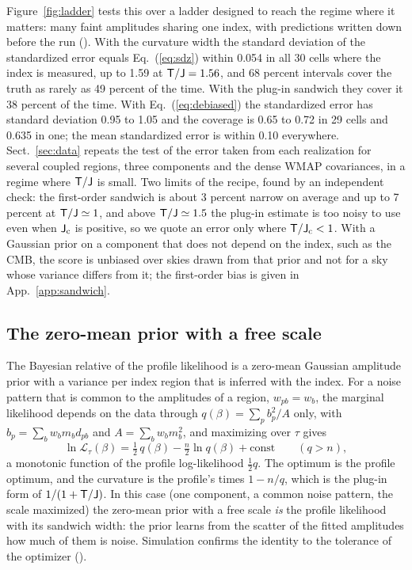 Figure~\ref{fig:ladder} tests this over a ladder designed to reach the regime where it matters:
many faint amplitudes sharing one index, with predictions written down before the run
(). With the curvature width the standard deviation of the standardized error equals
Eq.~(\ref{eq:sdz}) within 0.054 in all 30 cells where the index is measured, up to 1.59 at
$\mathsf{T}/\mathsf{J} = 1.56$, and 68 percent intervals cover the truth as rarely as 49 percent of the time. With
the plug-in sandwich they cover it 38 percent of the time. With Eq.~(\ref{eq:debiased}) the
standardized error has standard deviation 0.95 to 1.05 and the coverage is 0.65 to 0.72 in 29 cells
and 0.635 in one; the mean standardized error is within 0.10 everywhere. Sect.~\ref{sec:data} repeats
the test of the error taken from each realization for several coupled regions, three components and
the dense WMAP covariances, in a regime where $\mathsf{T}/\mathsf{J}$ is small. Two limits of the recipe, found by an independent check: the first-order
sandwich is about 3 percent narrow on average and up to 7 percent at $\mathsf{T}/\mathsf{J} \simeq 1$, and above
$\mathsf{T}/\mathsf{J} \simeq 1.5$ the plug-in estimate is too noisy to use even when $\mathsf{J}_{\rm c}$ is positive, so
we quote an error only where $\mathsf{T}/\mathsf{J}_{\rm c} < 1$. With a Gaussian prior on a component that does
not depend on the index, such as the CMB, the score is unbiased over skies drawn from that prior and
not for a sky whose variance differs from it; the first-order bias is given in
App.~\ref{app:sandwich}.

\subsection{The zero-mean prior with a free scale}

The Bayesian relative of the profile likelihood is a zero-mean Gaussian amplitude prior with a
variance per index region that is inferred with the index. For a noise pattern that is common to the
amplitudes of a region, $w_{pb} = w_b$, the marginal likelihood depends on the data through
$q(\beta) = \sum_p b_p^2/A$ only, with $b_p = \sum_b w_b m_b d_{pb}$ and $A = \sum_b w_b m_b^2$, and
maximizing over $\tau$ gives
\begin{equation}
  \ln\mathcal{L}_{\tau}(\beta) = \tfrac12\, q(\beta) - \tfrac{n}{2}\ln q(\beta) + \mathrm{const}
  \qquad (q > n) ,
\end{equation}
a monotonic function of the profile log-likelihood $\tfrac12 q$. The optimum is the profile optimum,
and the curvature is the profile's times $1 - n/q$, which is the plug-in form of $1/(1+\mathsf{T}/\mathsf{J})$. In
this case (one component, a common noise pattern, the scale maximized) the zero-mean prior with a
free scale \emph{is} the profile likelihood with its sandwich width: the prior learns from the scatter of the fitted amplitudes how much of them is noise.
Simulation confirms the identity to the tolerance of the optimizer ().

